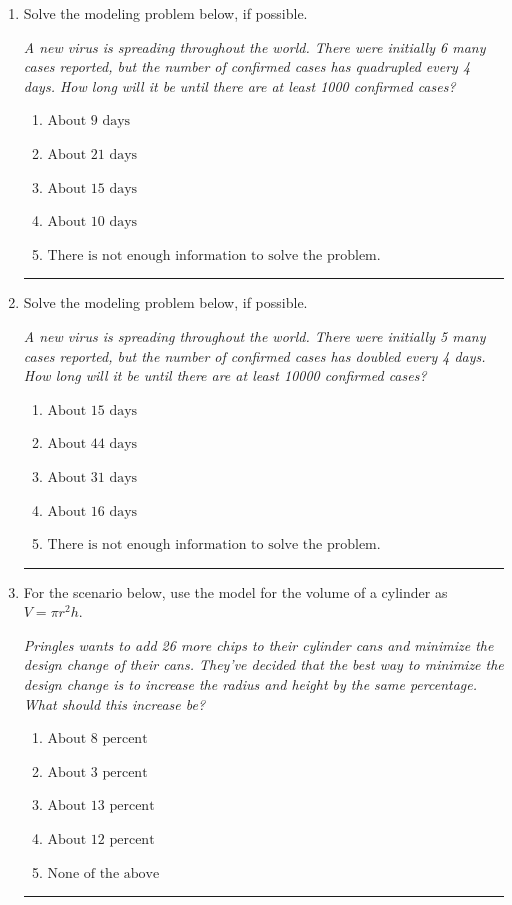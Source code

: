 \documentclass[14pt]{extbook}
\newcommand{\litem}[1]{\item#1\hspace*{-1cm}\rule{\textwidth}{0.4pt}}
\begin{document}
\begin{enumerate}
\litem{
Solve the modeling problem below, if possible.
\begin{center}
    \textit{ A new virus is spreading throughout the world. There were initially 6 many cases reported, but the number of confirmed cases has quadrupled every 4 days. How long will it be until there are at least 1000 confirmed cases? }
\end{center}
\begin{enumerate}[label=\Alph*.]
\item \( \text{About } 9 \text{ days} \)
\item \( \text{About } 21 \text{ days} \)
\item \( \text{About } 15 \text{ days} \)
\item \( \text{About } 10 \text{ days} \)
\item \( \text{There is not enough information to solve the problem.} \)

\end{enumerate} }
\litem{
Solve the modeling problem below, if possible.
\begin{center}
    \textit{ A new virus is spreading throughout the world. There were initially 5 many cases reported, but the number of confirmed cases has doubled every 4 days. How long will it be until there are at least 10000 confirmed cases? }
\end{center}
\begin{enumerate}[label=\Alph*.]
\item \( \text{About } 15 \text{ days} \)
\item \( \text{About } 44 \text{ days} \)
\item \( \text{About } 31 \text{ days} \)
\item \( \text{About } 16 \text{ days} \)
\item \( \text{There is not enough information to solve the problem.} \)

\end{enumerate} }
\litem{
For the scenario below, use the model for the volume of a cylinder as $V = \pi r^2 h$.
\begin{center}
    \textit{ Pringles wants to add 26 \text{percent} more chips to their cylinder cans and minimize the design change of their cans. They've decided that the best way to minimize the design change is to increase the radius and height by the same percentage. What should this increase be? }
\end{center}
\begin{enumerate}[label=\Alph*.]
\item \( \text{About } 8 \text{ percent} \)
\item \( \text{About } 3 \text{ percent} \)
\item \( \text{About } 13 \text{ percent} \)
\item \( \text{About } 12 \text{ percent} \)
\item \( \text{None of the above} \)


\end{enumerate}}
\end{enumerate}
\end{document}

